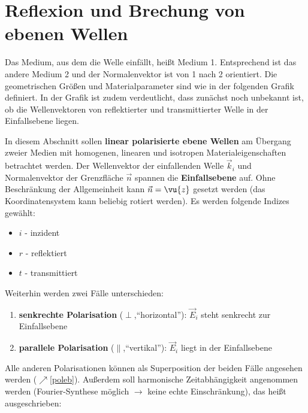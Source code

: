  \section{Reflexion und Brechung von ebenen Wellen}
 Das Medium, aus dem die Welle einfällt, heißt Medium 1. Entsprechend ist das andere Medium 2 und der Normalenvektor ist von 1 nach 2 orientiert. Die geometrischen Größen und Materialparameter sind wie in der folgenden Grafik definiert. In der Grafik ist zudem verdeutlicht, dass zunächst noch unbekannt ist, ob die Wellenvektoren von reflektierter und transmittierter Welle in der Einfallsebene liegen.\\
  \begin{minipage}{.5\textwidth}
	  \resizebox*{\textwidth}{!}{}
  \end{minipage}
  \begin{minipage}{.5\textwidth}
	  \resizebox*{\textwidth}{!}{}
  \end{minipage}
	   In diesem Abschnitt sollen \textbf{linear polarisierte ebene Wellen} am Übergang zweier Medien mit homogenen, linearen und isotropen Materialeigenschaften betrachtet werden. Der Wellenvektor der einfallenden Welle \(\vec{k}_i\) und Normalenvektor der Grenzfläche \(\vec{n}\) spannen die \textbf{Einfallsebene} auf. Ohne Beschränkung der Allgemeinheit kann \(\vec{n} = \vu{z}\) gesetzt werden (das Koordinatensystem kann beliebig rotiert werden).
	  Es werden folgende Indizes gewählt:
	  \begin{itemize}
	  	\item $i$ - inzident
	  	\item $r$ - reflektiert
	  	\item $t$ - transmittiert
	  \end{itemize} 
	  Weiterhin werden zwei Fälle unterschieden:
	  \begin{enumerate}
	  	\item \textbf{senkrechte Polarisation} ($\perp$,\enquote{horizontal}): $\vec{E}_i$ steht senkrecht zur Einfallsebene
	  	\item \textbf{parallele Polarisation} ($\parallel$,\enquote{vertikal}): $\vec{E}_i$ liegt in der Einfallsebene
	  \end{enumerate} 
	  Alle anderen Polarisationen können als Superposition der beiden Fälle angesehen werden ($\nearrow$\ref{poleb}). Außerdem soll harmonische Zeitabhängigkeit  angenommen werden (Fourier-Synthese möglich $\to$ keine echte Einschränkung), das heißt ausgeschrieben:
